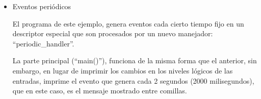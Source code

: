 \begin{itemize}
    \item Eventos periódicos
    
    El programa de este ejemplo, genera eventos cada cierto tiempo fijo en un descriptor especial que son procesados por un nuevo manejador: ``periodic\_handler''. 
    

    
    La parte principal (``main()''), funciona de la misma forma que el anterior, sin embargo, en lugar de imprimir los cambios en los niveles lógicos de las entradas, imprime el evento que genera cada 2 segundos (2000 milisegundos), que en este caso, es el mensaje mostrado entre comillas.


\end{itemize}
